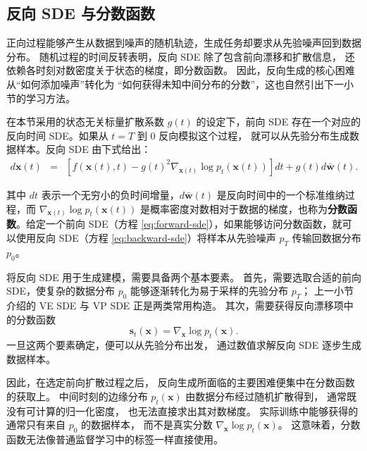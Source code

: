 \subsection{反向 SDE 与分数函数}

正向过程能够产生从数据到噪声的随机轨迹，生成任务却要求从先验噪声回到数据分布。
随机过程的时间反转表明，反向 SDE 除了包含前向漂移和扩散信息，
还依赖各时刻对数密度关于状态的梯度，即分数函数。
因此，反向生成的核心困难从“如何添加噪声”转化为
“如何获得未知中间分布的分数”，这也自然引出下一小节的学习方法。

在本节采用的状态无关标量扩散系数 $g(t)$ 的设定下，前向 SDE
存在一个对应的反向时间 SDE。如果从 $t=T$ 到 $0$ 反向模拟这个过程，
就可以从先验分布生成数据样本。反向 SDE 由下式给出：
\begin{eqnarray}
d\mathbf{x}(t) & = & \left[ f(\mathbf{x}(t), t) - g(t)^2 \nabla_{\mathbf{x}(t)} \log p_t(\mathbf{x}(t)) \right] dt + g(t) d\bar{\mathbf{w}}(t).
\label{eq:backward-sde}
\end{eqnarray}

\noindent 其中 $dt$ 表示一个无穷小的负时间增量，$d\bar{\mathbf{w}}(t)$ 是反向时间中的一个标准维纳过程，而 $\nabla_{\mathbf{x}(t)} \log p_t(\mathbf{x}(t))$ 是概率密度对数相对于数据的梯度，也称为\textbf{分数函数}。给定一个前向 SDE（方程 \eqref{eq:forward-sde}），如果能够访问分数函数，就可以使用反向 SDE（方程 \eqref{eq:backward-sde}）将样本从先验噪声 $p_T$ 传输回数据分布 $p_0$。




将反向 SDE 用于生成建模，需要具备两个基本要素。
首先，需要选取合适的前向 SDE，使复杂的数据分布
\(p_0\) 能够逐渐转化为易于采样的先验分布 \(p_T\)；
上一小节介绍的 VE SDE 与 VP SDE 正是两类常用构造。
其次，需要获得反向漂移项中的分数函数
\begin{equation}
    \mathbf{s}_t(\mathbf{x})
    =
    \nabla_{\mathbf{x}}\log p_t(\mathbf{x}).
    \label{eq:reverse-sde-score-function}
\end{equation}
一旦这两个要素确定，便可以从先验分布出发，
通过数值求解反向 SDE 逐步生成数据样本。

因此，在选定前向扩散过程之后，
反向生成所面临的主要困难便集中在分数函数的获取上。
中间时刻的边缘分布
\(p_t(\mathbf{x})\)
由数据分布经过随机扩散得到，
通常既没有可计算的归一化密度，
也无法直接求出其对数梯度。
实际训练中能够获得的通常只有来自
\(p_0\) 的数据样本，
而不是真实分数
\(\nabla_{\mathbf{x}}\log p_t(\mathbf{x})\)。
这意味着，分数函数无法像普通监督学习中的标签一样直接使用。

